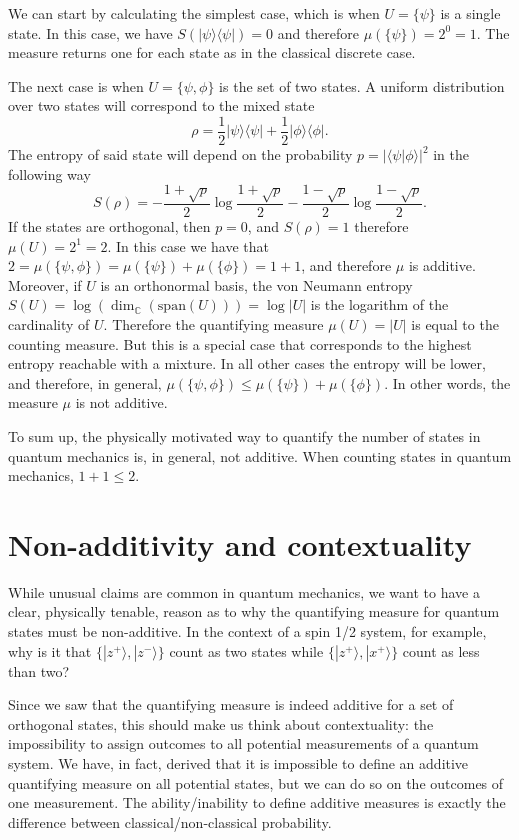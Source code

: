 \documentclass[10pt,twocolumn, nofootinbib]{revtex4-2}
\def\>{\rangle}
\def\<{\langle}
\begin{document}
We can start by calculating the simplest case, which is when $U = \{ \psi \}$ is a single state. In this case, we have $S(|\psi\>\<\psi|) = 0$ and therefore $\mu(\{\psi\}) = 2^{0} = 1$. The measure returns one for each state as in the classical discrete case.

The next case is when $U = \{ \psi, \phi \}$ is the set of two states. A uniform distribution over two states will correspond to the mixed state
\begin{equation}
	\rho = \frac{1}{2} |\psi\>\<\psi| + \frac{1}{2} |\phi\>\<\phi|.
\end{equation}
The entropy of said state will depend on the probability $p=|\<\psi | \phi \>|^2$ in the following way
\begin{equation}
	S(\rho) = - \frac{1+\sqrt{p}}{2} \log \frac{1+\sqrt{p}}{2} 
	- \frac{1-\sqrt{p}}{2} \log \frac{1-\sqrt{p}}{2}.
\end{equation}
If the states are orthogonal, then $p=0$, and $S(\rho) = 1$ therefore $\mu(U) = 2^1 = 2$. In this case we have that $2 = \mu(\{ \psi, \phi \}) = \mu(\{\psi\}) + \mu(\{\phi\}) = 1 + 1$, and therefore $\mu$ is additive. Moreover, if $U$ is an orthonormal basis, the von Neumann entropy $S(U) = \log(\dim_{\mathbb{C}}(\text{span}(U))) = \log |U|$ is the logarithm of the cardinality of $U$. Therefore the quantifying measure $\mu(U) = |U|$ is equal to the counting measure. But this is a special case that corresponds to the highest entropy reachable with a mixture. In all other cases the entropy will be lower, and therefore, in general, $\mu(\{ \psi, \phi \}) \leq \mu(\{\psi\}) + \mu(\{\phi\})$. In other words, the measure $\mu$ is not additive.

To sum up, the physically motivated way to quantify the number of states in quantum mechanics is, in general, not additive. When counting states in quantum mechanics, $1+1 \leq 2$.

\section{Non-additivity and contextuality}

While unusual claims are common in quantum mechanics, we want to have a clear, physically tenable, reason as to why the quantifying measure for quantum states must be non-additive. In the context of a spin 1/2 system, for example, why is it that $\{ |z^+\>, |z^-\>\}$ count as two states while $\{ |z^+\>, |x^+\> \}$ count as less than two?

Since we saw that the quantifying measure is indeed additive for a set of orthogonal states, this should make us think about contextuality: the impossibility to assign outcomes to all potential measurements of a quantum system. We have, in fact, derived that it is impossible to define an additive quantifying measure on all potential states, but we can do so on the outcomes of one measurement. The ability/inability to define additive measures is exactly the difference between classical/non-classical probability.
\end{document}
